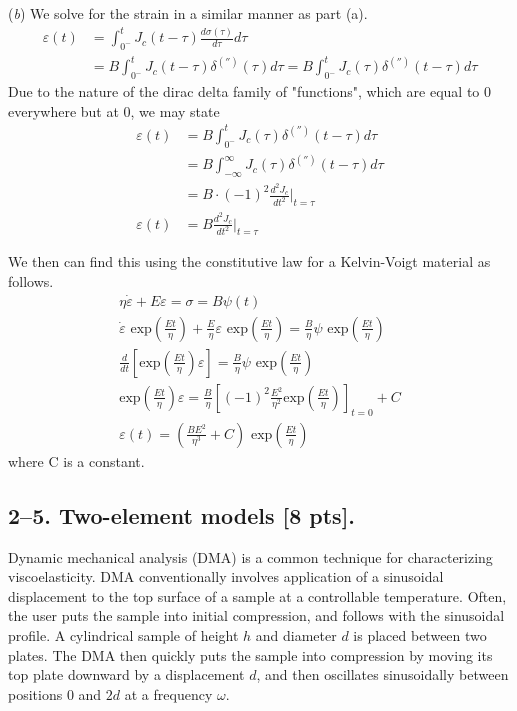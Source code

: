 (\textit{b}) We solve for the strain in a similar manner as part (a).
\begin{align*}
    \varepsilon(t)&=\int_{0^-}^tJ_c(t-\tau)\frac{d\sigma(\tau)}{d\tau}d\tau\\
    &=B\int_{0^-}^tJ_c(t-\tau)\delta^{('')}(\tau)d\tau=B\int_{0^-}^tJ_c(\tau)\delta^{('')}(t-\tau)d\tau
\end{align*}
Due to the nature of the dirac delta family of "functions", which are equal to 0 everywhere but at 0, we may state
\begin{align*}
    \varepsilon(t)&=B\int_{0^-}^tJ_c(\tau)\delta^{('')}(t-\tau)d\tau\\
    &=B\int_{-\infty}^{\infty}J_c(\tau)\delta^{('')}(t-\tau)d\tau\\
    &=B\cdot(-1)^2\frac{d^2J_c}{dt^2}|_{t=\tau}\\
    \varepsilon(t)&=B\frac{d^2J_c}{dt^2}|_{t=\tau}
\end{align*}

We then can find this using the constitutive law for a Kelvin-Voigt material as follows.
\begin{gather*}
    \eta\dot{\varepsilon}+E\varepsilon=\sigma=B\psi(t)\\
    \dot{\varepsilon}\text{ exp}( \frac{Et}{\eta})+\frac{E}{\eta}\varepsilon\text{ exp}(\frac{Et}{\eta})=\frac{B}{\eta}\psi\text{ exp}(\frac{Et}{\eta})\\
    \frac{d}{dt}[\text{exp}(\frac{Et}{\eta})\varepsilon]=\frac{B}{\eta}\psi\text{ exp}(\frac{Et}{\eta})\\
    \text{exp}(\frac{Et}{\eta})\varepsilon=\frac{B}{\eta}[(-1)^2\frac{E^2}{\eta^2}\text{exp}(\frac{Et}{\eta})]_{t=0}+C\\
    \varepsilon(t)=(\frac{BE^2}{\eta^3}+C)\text{ exp}(\frac{Et}{\eta})
\end{gather*}
where C is a constant.

\bigskip
\subsection*{2--5. \textbf{Two-element models} [8 pts].}

Dynamic mechanical analysis (DMA) is a common technique for characterizing viscoelasticity. 
DMA conventionally involves application of a sinusoidal displacement to the top surface of a sample at a controllable temperature. 
Often, the user puts the sample into initial compression, and follows with the sinusoidal profile. 
A cylindrical sample of height $h$ and diameter $d$ is placed between two plates.
The DMA then quickly puts the sample into compression by moving its top plate downward by a displacement $d$, and then oscillates sinusoidally between positions $0$ and $2d$ at a frequency $\omega$.

